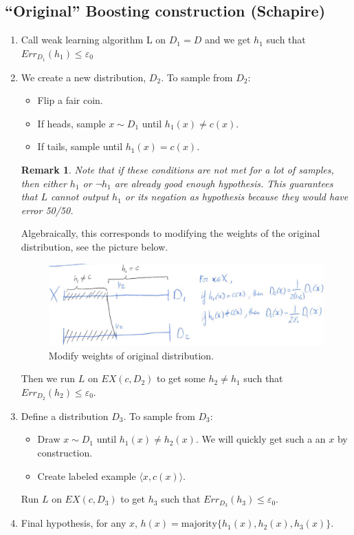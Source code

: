 \documentclass[12pt, letterpaper]{article}
\numberwithin{equation}{section} %
\newcommand{\ve}{\varepsilon}
\newtheorem{remark}[theorem]{Remark}
\theoremstyle{definition}
\theoremstyle{remark}
\begin{document}
\subsection{``Original'' Boosting construction (Schapire)}
\begin{enumerate}
\item Call weak learning algorithm L on $D_1 = D$ and we get $h_1$ such that $Err_{D_1}(h_1)\leq \ve_0$
\item We create a new distribution, $D_2$. To sample from $D_2$:
\begin{itemize}
\item Flip a fair coin.
\item If heads, sample $x\sim D_1$ until $h_1(x)\ne c(x)$.
\item If tails, sample until $h_1(x) = c(x)$. 
\end{itemize}
\begin{remark}
Note that if these conditions are not met for a lot of samples, then either $h_1$ or $\lnot h_1$ are already good enough hypothesis. This guarantees that $L$ cannot output $h_1$ or its negation as hypothesis because they would have error 50/50.
\end{remark}
Algebraically, this corresponds to modifying the weights of the original distribution, see the picture below.
\begin{figure}[H]
\centering
\includegraphics[width=0.6\linewidth]{img/weights.png}
\caption{Modify weights of original distribution.}
\end{figure}
Then we run $L$ on $EX(c,D_2)$ to get some $h_2\ne h_1$ such that $Err_{D_2}(h_2)\leq \ve_0$.
\item Define a distribution $D_3$. To sample from $D_3$:
\begin{itemize}
\item Draw $x\sim D_1$ until $h_1(x) \ne h_2(x)$. We will quickly get such a an $x$ by construction.
\item Create labeled example $\langle x, c(x) \rangle$.
\end{itemize}
Run $L$ on $EX(c, D_3)$ to get $h_3$ such that $Err_{D_3}(h_3)\leq \ve_0$.
\item Final hypothesis, for any $x$, $h(x) = \mathrm{majority}\lbrace h_1(x), h_2(x), h_3(x)\rbrace$.
\end{enumerate}
\end{document}
